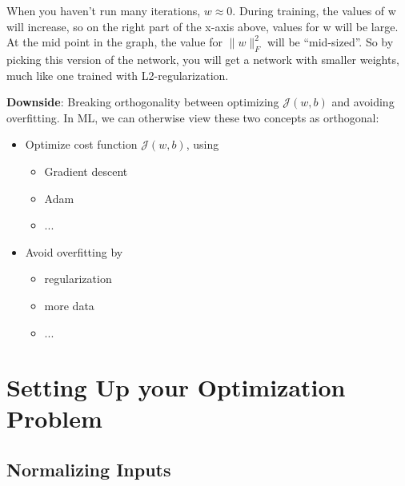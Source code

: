 When you haven't run many iterations, $w\approx0$. During training, the values of w will increase,
so on the right part of the x-axis above, values for w will be large. At the mid point in the graph, 
the value for $\|w\|_F^2$  will be ``mid-sized''. So by picking this version of the network, 
you will get a network with smaller weights, much like one trained with L2-regularization.

\textbf{Downside}: Breaking orthogonality between optimizing $\mathcal{J}(w, b)$ and avoiding overfitting. 
In ML, we can otherwise view these two concepts as orthogonal:

\begin{itemize}
	\item Optimize cost function $\mathcal{J}(w, b)$, using
	\begin{itemize}
		\item Gradient descent
		\item Adam
		\item ...
    \end{itemize}
	\item Avoid overfitting by
    \begin{itemize}
        \item regularization
		\item more data
		\item ...
    \end{itemize}
\end{itemize}







\section{Setting Up your Optimization Problem}

\subsection*{Normalizing Inputs}

